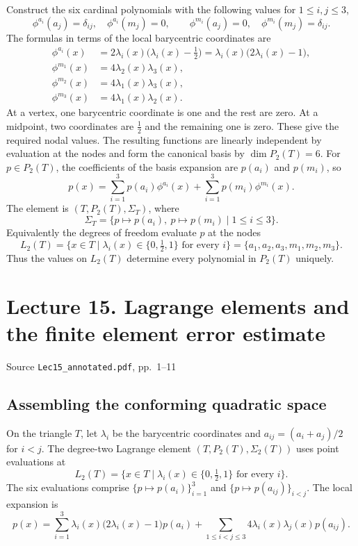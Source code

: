 \documentclass[11pt,a4paper]{article}
\newcommand{\lecturesource}[1]{%
  \par{\small\sffamily\color{Muted}#1}\par\vspace{0.15em}}
\begin{document}
Construct the six cardinal polynomials with the following values for \(1\le i,j\le3\),
\[
 \phi^{a_i}(a_j)=\delta_{ij},\quad \phi^{a_i}(m_j)=0,\qquad
 \phi^{m_i}(a_j)=0,\quad \phi^{m_i}(m_j)=\delta_{ij}.
\]
The formulas in terms of the local barycentric coordinates are
\begin{align*}
 \phi^{a_i}(x)&=2\lambda_i(x)\bigl(\lambda_i(x)-\tfrac12\bigr)
               =\lambda_i(x)\bigl(2\lambda_i(x)-1\bigr),\\
 \phi^{m_1}(x)&=4\lambda_2(x)\lambda_3(x),\\
 \phi^{m_2}(x)&=4\lambda_1(x)\lambda_3(x),\\
 \phi^{m_3}(x)&=4\lambda_1(x)\lambda_2(x).
\end{align*}
At a vertex, one barycentric coordinate is one and the rest are zero. At a midpoint, two coordinates are \(\tfrac12\) and the remaining one is zero. These give the required nodal values. The resulting functions are linearly independent by evaluation at the nodes and form the canonical basis by \(\dim P_2(T)=6\). For \(p\in P_2(T)\), the coefficients of the basis expansion are \(p(a_i)\) and \(p(m_i)\), so
\[
 p(x)=\sum_{i=1}^3 p(a_i)\phi^{a_i}(x)
       +\sum_{i=1}^3 p(m_i)\phi^{m_i}(x).
\]
The element is \((T,P_2(T),\Sigma_T)\), where
\[
 \Sigma_T=\{p\mapsto p(a_i),\ p\mapsto p(m_i)\mid 1\le i\le3\}.
\]
Equivalently the degrees of freedom evaluate \(p\) at the nodes
\[
 L_2(T)=\{x\in T\mid \lambda_i(x)\in\{0,\tfrac12,1\}
                          \text{ for every }i\}
       =\{a_1,a_2,a_3,m_1,m_2,m_3\}.
\]
Thus the values on \(L_2(T)\) determine every polynomial in \(P_2(T)\) uniquely.

\clearpage
\section{Lecture 15. Lagrange elements and the finite element error estimate}
\lecturesource{Source \enspace\texttt{Lec15\_annotated.pdf}, pp.~1--11}
\label{sec:mtl781-lec15}

\subsection{Assembling the conforming quadratic space}

On the triangle \(T\), let \(\lambda_i\) be the barycentric coordinates and \(a_{ij}=(a_i+a_j)/2\) for \(i<j\). The degree-two Lagrange element \((T,P_2(T),\Sigma_2(T))\) uses point evaluations at
\[
 L_2(T)=\{x\in T\mid \lambda_i(x)\in\{0,\tfrac12,1\}
                              \text{ for every }i\}.
\]
The six evaluations comprise \(\{p\mapsto p(a_i)\}_{i=1}^3\) and \(\{p\mapsto p(a_{ij})\}_{i<j}\). The local expansion is
\[
 p(x)=\sum_{i=1}^3\lambda_i(x)\bigl(2\lambda_i(x)-1\bigr)p(a_i)
          +\sum_{1\leq i<j\leq3}4\lambda_i(x)\lambda_j(x)p(a_{ij}).
\]
\end{document}
